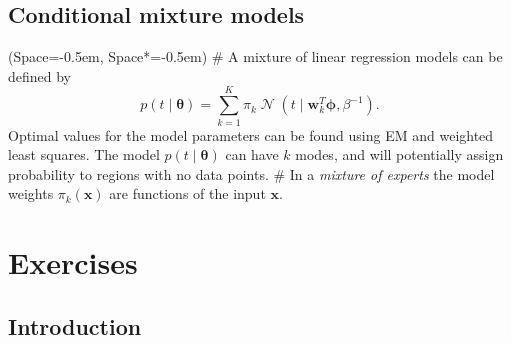 \documentclass[12pt, a4paper]{article}
\newcommand{\listSpace}{-0.5em}%
\newcommand{\vect}[1]{\bm{#1}}
\DeclareMathOperator{\N}{\mathcal{N}}
\begin{document}
\subsection*{Conditional mixture models}
\begin{easylist}[itemize]
	\ListProperties(Space=\listSpace, Space*=\listSpace)
	# A mixture of linear regression models can be defined by
	\begin{equation*}
		p(t \mid \vect{\theta})
		=
		\sum_{k=1}^{K} \pi_k \N (t \mid \vect{w}_k^T \vect{\phi}, \beta^{-1}).
	\end{equation*}
	Optimal values for the model parameters can be found using EM and weighted least squares.
	The model $p(t \mid \vect{\theta})$ can have $k$ modes, and will potentially assign probability to regions with no data points.
	# In a \emph{mixture of experts} the model weights $\pi_k(\vect{x})$ are functions of the input $\vect{x}$.
\end{easylist}

















\clearpage
\section{Exercises}

\subsection{Introduction}
\end{document}
